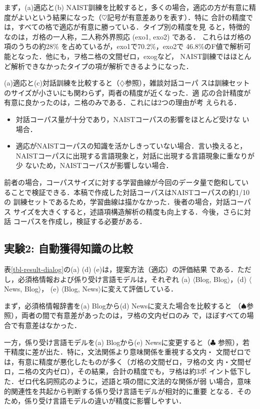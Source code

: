 \documentclass[japanese]{jnlp_1.4}
\begin{document}
まず，(a)適応と(b) NAIST訓練を比較すると，多くの場合，適応の方が有意に精
度がよいという結果になった（$\heartsuit$記号が有意差ありを表す）．特に
合計の精度では，すべての格で適応が有意に勝っている．タイプ別の精度を見
ると，特徴的なのは，ガ格の一人称，二人称外界照応 (exo1, exo2) である．
これらはガ格の項のうちの約28\% を占めているが，exo1で70.2\%，exo2で
46.8\%のF値で解析可能となった．他にも，ヲ格ニ格の文間ゼロ，exogなど，
NAIST訓練ではほとんど解析できなかったタイプの項が解析できるようになった．

(a)適応と(c)対話訓練を比較すると（$\diamondsuit$参照），雑談対話コーパ
スは訓練セットのサイズが小さいにも関わらず，両者の精度が近くなった．適
応の合計精度が有意に良かったのは，ニ格のみである．これには2つの理由が考
えられる．

\begin{itemize}
\item 対話コーパス量が十分であり，NAISTコーパスの影響をほとんど受けな
い場合．
\item 適応がNAISTコーパスの知識を活かしきっていない場合．言い換えると，
NAISTコーパスに出現する言語現象と，対話に出現する言語現象に重なりが少
ないため，NAISTコーパスが影響しない場合．
\end{itemize}

前者の場合，コーパスサイズに対する学習曲線が今回のデータ量で飽和してい
ることで検証できる．本稿で作成した対話コーパスはNAISTコーパスの約1/10の
訓練セットであるため，学習曲線は描かなかった．後者の場合，対話コーパス
サイズを大きくすると，述語項構造解析の精度も向上する．今後，さらに対話
コーパスを作成し，検証する必要がある．


\subsection{実験2: 自動獲得知識の比較}

表\ref{tbl-result-dialog}の(a) (d) (e)は，提案方法（適応）の評価結果
である．ただし，必須格情報および係り受け言語モデルは，それぞれ
(a) $\langle$Blog, Blog$\rangle$，(d) $\langle$News, Blog$\rangle$，
(e) $\langle$Blog, News$\rangle$に変えて評価している．

まず，必須格情報辞書を(a) Blogから(d) Newsに変えた場合を比較すると
（$\spadesuit$参照），両者の間で有意差があったのは，ヲ格の文内ゼロのみ
で，ほぼすべての場合で有意差はなかった．

一方，係り受け言語モデルを(a) Blogから(e) Newsに変更すると（$\clubsuit$
参照），若干精度に差が出た．特に，文法関係より意味関係を重視する文内・
文間ゼロでは，有意に精度が悪化したものが多く（ガ格の文間ゼロ，ヲ格の文
内・文間ゼロ，ニ格の文内ゼロ），その結果，合計の精度でも，ヲ格は約3ポ
イント低下した．ゼロ代名詞照応のように，述語と項の間に文法的な関係が弱
い場合，意味的関連性を共起から判断する係り受け言語モデルが相対的に重要
となる．そのため，係り受け言語モデルの違いが精度に影響しやすい．
\end{document}
